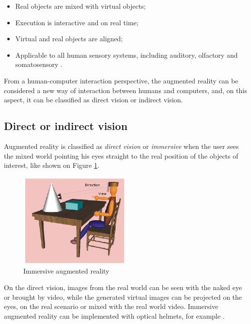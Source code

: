 \documentclass[msc, a4paper, classic, en]{ufbathesis}
\begin{document}
\begin{itemize}
  \item Real objects are mixed with virtual objects;
  \item Execution is interactive and on real time;
  \item Virtual and real objects are aligned;
  \item Applicable to all human sensory systems, including auditory, olfactory and somatosensory \cite{azuma01}.
\end{itemize}

From a human-computer interaction perspective, the augmented reality can be considered a new way of interaction between humans and computers, and, on this aspect, it can be classified as direct vision or indirect vision.

\subsection{Direct or indirect vision}

Augmented reality is classified as \textit{direct vision} or \textit{immersive} when the user sees the mixed world pointing his eyes straight to the real position of the objects of interest, like shown on Figure \ref{fig:direct}.

\begin{figure}
\label{fig:direct}
\centering
\includegraphics[width=0.5\textwidth]{images/direct.png}
\caption{Immersive augmented reality}
\end{figure}

On the direct vision, images from the real world can be seen with the naked eye or brought by video, while the generated virtual images can be projected on the eyes, on the real scenario or mixed with the real world video. Immersive augmented reality can be implemented with optical helmets, for example \cite{tori2006fundamentos}.
\end{document}
